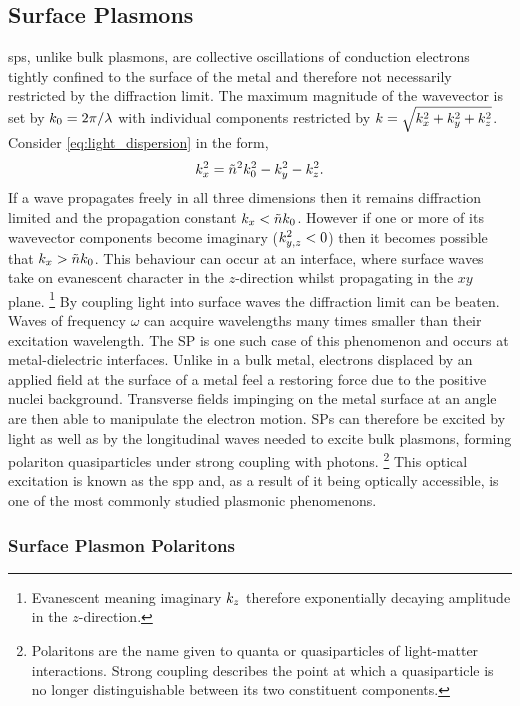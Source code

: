 \documentclass{article}
\begin{document}
\subsection{Surface Plasmons}

\Glspl{sp}, unlike bulk plasmons, are collective oscillations of conduction electrons tightly confined to the surface of the metal and therefore not necessarily restricted by the diffraction limit. The maximum magnitude of the wavevector is set by $k_0=2\pi/\lambda$ with individual components restricted by $k = \sqrt{k_x^2 + k_y^2 + k_z^2}$. Consider \eqref{eq:light_dispersion} in the form,
\begin{equation}
	k_x^2 = \tilde{n}^2 k_0^2 - k_y^2 - k_z^2.
\end{equation}
If a wave propagates freely in all three dimensions then it remains diffraction limited and the propagation constant $k_x < \tilde{n}k_0$. However if one or more of its wavevector components become imaginary ($k_{y,z}^2 < 0$) then it becomes possible that $k_x > \tilde{n}k_0$. This behaviour can occur at an interface, where surface waves take on evanescent character in the $z$-direction whilst propagating in the $xy$ plane.%
\footnote{Evanescent meaning imaginary $k_z$ therefore exponentially decaying amplitude in the $z$-direction.}
By coupling light into surface waves the diffraction limit can be beaten. Waves of frequency $\omega$ can acquire wavelengths many times smaller than their excitation wavelength. The SP is one such case of this phenomenon and occurs at metal-dielectric interfaces. Unlike in a bulk metal, electrons displaced by an applied field at the surface of a metal feel a restoring force due to the positive nuclei background. Transverse fields impinging on the metal surface at an angle are then able to manipulate the electron motion. SPs can therefore be excited by light as well as by the longitudinal waves needed to excite bulk plasmons, forming polariton quasiparticles under strong coupling with photons.%
\footnote{Polaritons are the name given to quanta or quasiparticles of light-matter interactions. Strong coupling describes the point at which a quasiparticle is no longer distinguishable between its two constituent components.}
This optical excitation is known as the \gls{spp} and, as a result of it being optically accessible, is one of the most commonly studied plasmonic phenomenons.

\subsubsection{Surface Plasmon Polaritons}
\end{document}
